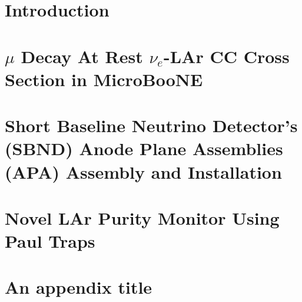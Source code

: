 \documentclass[twoside,openright,12pt,a4paper]{report}
\begin{document}
\capa
\folhadeaprovacao
\adedicatoria
\notaagradecimento
\acitacao
\tableofcontents
\listoffigures 
\listoftables
\linenumbers

\inicio

\chapter{Introduction}


\chapter{$\mu$ Decay At Rest $\nu_{e}$-LAr CC Cross Section in MicroBooNE}


\chapter{Short Baseline Neutrino Detector's (SBND) Anode Plane Assemblies (APA) Assembly and Installation}


\chapter{Novel LAr Purity Monitor Using Paul Traps}


\appendix %
\isappendixtrue %
\renewcommand\chaptername{Appendix}

\chapter{An appendix title}







\begin{thebibliography}{10}




\end{thebibliography}


\end{document}
